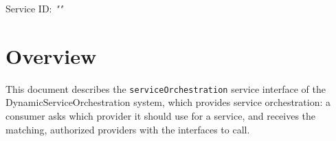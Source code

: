 \documentclass[a4paper]{arrowhead}
\begin{document}
\sloppy

\ArrowheadSetup

\begin{center}
  \vspace*{1cm}
  \huge{\arrowtitle}

  \vspace*{0.2cm}
  \LARGE{\arrowtype}
  \vspace*{1cm}

  \Large{Service ID: \textit{"\arrowid"}}

  \vspace*{\fill}


  \vspace*{1cm}
  \vspace*{\fill}

  \begin{abstract}
    This document describes the HTTP/1.1 protocol with TLS payload security and JSON payload encoding variant of the \texttt{service\allowbreak{}Orchestration} service of the DynamicServiceOrchestration system.
  \end{abstract}

  \vspace*{1cm}
\end{center}

\newpage

\tableofcontents
\newpage

\section{Overview}
\label{sec:overview}

This document describes the \texttt{service\allowbreak{}Orchestration} service interface of the DynamicServiceOrchestration system, which provides service orchestration: a consumer asks which provider it should use for a service, and receives the matching, authorized providers with the interfaces to call.
\end{document}
